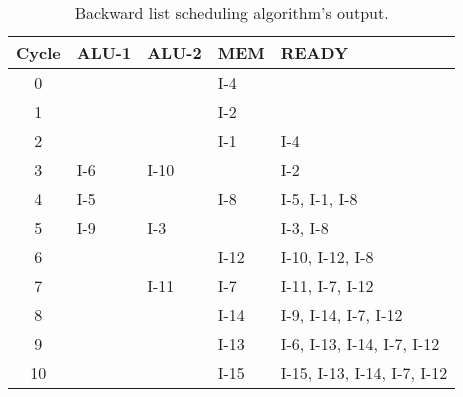 \begin{itemize}
\begin{table}[!ht]
\centering
\begin{tabular}{c|l|l|l|l}
  \toprule
  \toprule
  \textbf{Cycle} & \textbf{ALU-1} & \textbf{ALU-2} & \textbf{MEM} & \textbf{READY} \\
  \midrule
  0  &      &      &  I-4  &                               \\ \hline
  1  &      &      &  I-2  &                               \\ \hline
  2  &      &      &  I-1  & I-4                           \\ \hline
  3  & I-6  & I-10 &       & I-2                           \\ \hline
  4  & I-5  &      &  I-8  & I-5, I-1, I-8                 \\ \hline
  5  & I-9  & I-3  &       & I-3, I-8                      \\ \hline
  6  &      &      &  I-12 & I-10, I-12, I-8               \\ \hline
  7  &      & I-11 &  I-7  & I-11, I-7, I-12               \\ \hline
  8  &      &      &  I-14 & I-9, I-14, I-7, I-12          \\ \hline
  9  &      &      &  I-13 & I-6, I-13, I-14, I-7, I-12    \\ \hline
  10 &      &      &  I-15 & I-15, I-13, I-14, I-7, I-12   \\ \hline
  \bottomrule
\end{tabular}
\caption{Backward list scheduling algorithm's output.}
\end{table}

\end{itemize}

